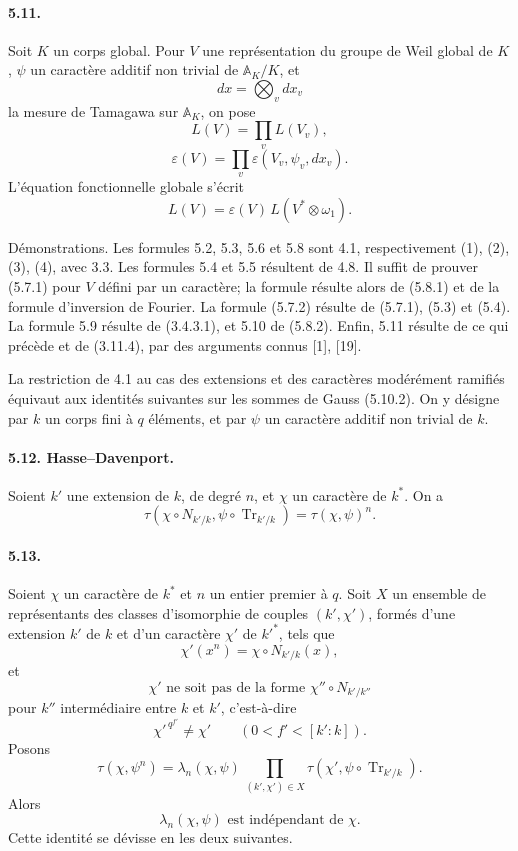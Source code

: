 \documentclass[10pt,letterpaper]{article}
\newcommand{\Tr}{\operatorname{Tr}}
\providecommand{\Tr}{\operatorname{Tr}}
\providecommand{\Tr}{\operatorname{Tr}}
\providecommand{\Tr}{\operatorname{Tr}}
\begin{document}
\paragraph{5.11.} Soit \(K\) un corps global. Pour \(V\) une représentation du groupe de Weil global de \(K\), \(\psi\) un caractère additif non trivial de \(\mathbb A_K/K\), et
\[
dx=\bigotimes_v dx_v
\]
la mesure de Tamagawa sur \(\mathbb A_K\), on pose
\[
\tag{5.11.1}
L(V)=\prod_v L(V_v),
\]
\[
\tag{5.11.2}
\varepsilon(V)=\prod_v\varepsilon(V_v,\psi_v,dx_v).
\]
L'équation fonctionnelle globale s'écrit
\[
\tag{5.11.3}
L(V)=\varepsilon(V)\,L(V^*\otimes\omega_1).
\]

Démonstrations. Les formules 5.2, 5.3, 5.6 et 5.8 sont 4.1, respectivement (1), (2), (3), (4), avec 3.3. Les formules 5.4 et 5.5 résultent de 4.8. Il suffit de prouver (5.7.1) pour \(V\) défini par un caractère; la formule résulte alors de (5.8.1) et de la formule d'inversion de Fourier. La formule (5.7.2) résulte de (5.7.1), (5.3) et (5.4). La formule 5.9 résulte de (3.4.3.1), et 5.10 de (5.8.2). Enfin, 5.11 résulte de ce qui précède et de (3.11.4), par des arguments connus [1], [19].

La restriction de 4.1 au cas des extensions et des caractères modérément ramifiés équivaut aux identités suivantes sur les sommes de Gauss (5.10.2). On y désigne par \(k\) un corps fini à \(q\) éléments, et par \(\psi\) un caractère additif non trivial de \(k\).

\paragraph{5.12. Hasse--Davenport.} Soient \(k'\) une extension de \(k\), de degré \(n\), et \(\chi\) un caractère de \(k^*\). On a
\[
\tag{5.12.1}
\tau(\chi\circ N_{k'/k},\psi\circ\Tr_{k'/k})
=
\tau(\chi,\psi)^n.
\]

\paragraph{5.13.} Soient \(\chi\) un caractère de \(k^*\) et \(n\) un entier premier à \(q\). Soit \(X\) un ensemble de représentants des classes d'isomorphie de couples \((k',\chi')\), formés d'une extension \(k'\) de \(k\) et d'un caractère \(\chi'\) de \(k'^*\), tels que
\[
\tag{a}
\chi'(x^n)=\chi\circ N_{k'/k}(x),
\]
et
\[
\tag{b}
\chi'\text{ ne soit pas de la forme }\chi''\circ N_{k'/k''}
\]
pour \(k''\) intermédiaire entre \(k\) et \(k'\), c'est-à-dire
\[
\chi'^{\,q^{f'}}\ne\chi'
\qquad(0<f'<[k':k]).
\]
Posons
\[
\tau(\chi,\psi^n)=
\lambda_n(\chi,\psi)\,
\prod_{(k',\chi')\in X}
\tau(\chi',\psi\circ\Tr_{k'/k}).
\]
Alors
\[
\tag{5.13.1}
\lambda_n(\chi,\psi)\text{ est indépendant de }\chi.
\]
Cette identité se dévisse en les deux suivantes.
\end{document}
